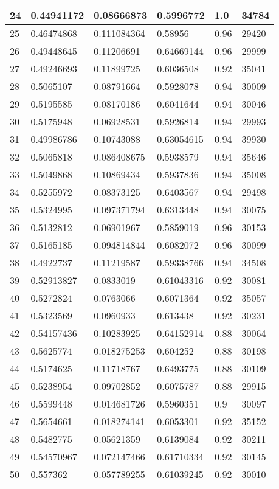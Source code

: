 \begin{longtable}{|l|l|l|l|l|l|}
24 & 0.44941172 & 0.08666873 & 0.5996772 & 1.0 & 34784 \\ \hline 
25 & 0.46474868 & 0.111084364 & 0.58956 & 0.96 & 29420 \\ \hline 
26 & 0.49448645 & 0.11206691 & 0.64669144 & 0.96 & 29999 \\ \hline 
27 & 0.49246693 & 0.11899725 & 0.6036508 & 0.92 & 35041 \\ \hline 
28 & 0.5065107 & 0.08791664 & 0.5928078 & 0.94 & 30009 \\ \hline 
29 & 0.5195585 & 0.08170186 & 0.6041644 & 0.94 & 30046 \\ \hline 
30 & 0.5175948 & 0.06928531 & 0.5926814 & 0.94 & 29993 \\ \hline 
31 & 0.49986786 & 0.10743088 & 0.63054615 & 0.94 & 39930 \\ \hline 
32 & 0.5065818 & 0.086408675 & 0.5938579 & 0.94 & 35646 \\ \hline 
33 & 0.5049868 & 0.10869434 & 0.5937836 & 0.94 & 35008 \\ \hline 
34 & 0.5255972 & 0.08373125 & 0.6403567 & 0.94 & 29498 \\ \hline 
35 & 0.5324995 & 0.097371794 & 0.6313448 & 0.94 & 30075 \\ \hline 
36 & 0.5132812 & 0.06901967 & 0.5859019 & 0.96 & 30153 \\ \hline 
37 & 0.5165185 & 0.094814844 & 0.6082072 & 0.96 & 30099 \\ \hline 
38 & 0.4922737 & 0.11219587 & 0.59338766 & 0.94 & 34508 \\ \hline 
39 & 0.52913827 & 0.0833019 & 0.61043316 & 0.92 & 30081 \\ \hline 
40 & 0.5272824 & 0.0763066 & 0.6071364 & 0.92 & 35057 \\ \hline 
41 & 0.5323569 & 0.0960933 & 0.613438 & 0.92 & 30231 \\ \hline 
42 & 0.54157436 & 0.10283925 & 0.64152914 & 0.88 & 30064 \\ \hline 
43 & 0.5625774 & 0.018275253 & 0.604252 & 0.88 & 30198 \\ \hline 
44 & 0.5174625 & 0.11718767 & 0.6493775 & 0.88 & 30109 \\ \hline 
45 & 0.5238954 & 0.09702852 & 0.6075787 & 0.88 & 29915 \\ \hline 
46 & 0.5599448 & 0.014681726 & 0.5960351 & 0.9 & 30097 \\ \hline 
47 & 0.5654661 & 0.018274141 & 0.6053301 & 0.92 & 35152 \\ \hline 
48 & 0.5482775 & 0.05621359 & 0.6139084 & 0.92 & 30211 \\ \hline 
49 & 0.54570967 & 0.072147466 & 0.61710334 & 0.92 & 30145 \\ \hline 
50 & 0.557362 & 0.057789255 & 0.61039245 & 0.92 & 30010 \\ \hline 
\end{longtable}